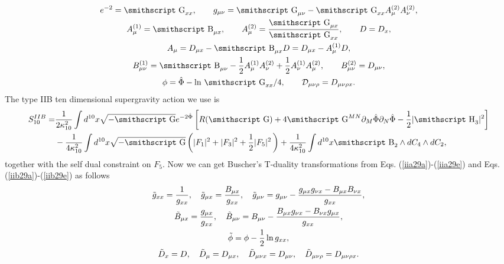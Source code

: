\documentclass[a4paper,12pt]{article}
\newcommand{\mathst}[1]{\mbox{\smithscript #1}}
\begin{document}
\begin{subequations}
\begin{gather}
\label{iib29a}
e^{-2}={\mathst G}_{xx},\qquad g_{\mu\nu}
={\mathst G}_{\mu\nu}-
{\mathst G}_{xx}A^{(2)}_\mu A^{(2)}_\nu,\\
\label{iib29b}
A^{(1)}_\mu={\mathst B}_{\mu x}, \qquad
A^{(2)}_\mu={{\mathst G}_{\mu x}\over {\mathst G}_{xx}},\qquad
D=D_x,\\
\label{iib29c}
A_\mu=D_{\mu x}-{\mathst B}_{\mu x} D
=D_{\mu x}-A^{(1)}_\mu D,\\
\label{iib29d}
B^{(1)}_{\mu\nu}={\mathst B}_{\mu\nu}-
{1\over 2}A^{(1)}_\mu A^{(2)}_\nu
+{1\over 2}A^{(1)}_\nu A^{(2)}_\mu,\qquad 
B^{(2)}_{\mu\nu}=D_{\mu\nu},\\
\label{iib29e}
\phi={\hat \Phi}-\ln\,{\mathst G}_{xx}/4, \qquad 
{\cal D}_{\mu\nu\rho}=D_{\mu\nu\rho x}.
\end{gather}
\end{subequations}
The type IIB ten dimensional supergravity action we
use is
\begin{equation}
\label{iib}
\begin{split}
S^{IIB}_{10}=&{1\over 2\kappa^2_{10}}\int d^{10}x 
\sqrt{-{\mathst G}}
e^{-2\hat \Phi}\left[R({\mathst G})+
4 {\mathst G}^{MN}\partial_M \hat \Phi
\partial_N \hat \Phi -{1\over 2}
|{\mathst H}_3|^2\right]\\
&-{1\over 4\kappa^2_{10}}\int d^{10}x \sqrt{-{\mathst G}}
\left(|F_1|^2+|F_3|^2+{1\over 2}|F_5|^2\,\right)
+{1\over 4\kappa^2_{10}}\int d^{10}x
{\mathst B}_2\wedge dC_4\wedge dC_2,
\end{split}
\end{equation}
together with the self dual constraint on $F_5$.
Now we can get Buscher's T-duality transformations
\cite{buscher87} from Eqs. (\ref{iia29a})-(\ref{iia29e})
and Eqs. (\ref{iib29a})-(\ref{iib29e}) as follows
\begin{subequations}
\begin{gather}
\label{factdula}
{\tilde g}_{xx}={1\over g_{xx}},\quad
{\tilde g}_{\mu x}={B_{\mu x}\over g_{xx}},\quad
{\tilde g}_{\mu\nu}=g_{\mu\nu}-{g_{\mu x}g_{\nu x}-B_{\mu x}B_{\nu x}
\over g_{xx}},\\
\label{factduld}
{\tilde B}_{\mu x}={g_{\mu x}\over g_{xx}},\quad
{\tilde B}_{\mu\nu}=B_{\mu\nu}-{B_{\mu x}g_{\nu x}
-B_{\nu x}g_{\mu x} \over g_{xx}},\\
\label{factdulf}
{\tilde \phi}=\phi-{1\over 2}\ln g_{xx},\\
\label{factdulg}
{\tilde D}_x=D,\quad {\tilde D}_\mu=D_{\mu x},\quad
{\tilde D}_{\mu\nu x}=D_{\mu\nu},\quad
{\tilde D}_{\mu\nu\rho}=D_{\mu\nu\rho x}.
\end{gather}
\end{subequations}
\end{document}
